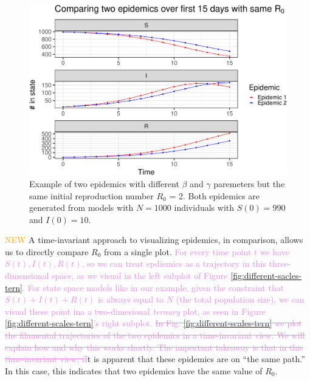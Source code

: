 \documentclass[
  shortnames]{jss}
\begin{document}
\begin{CodeChunk}
\begin{figure}[H]

{\centering \includegraphics{Figs/unnamed-chunk-2-1} 

}

\caption{\label{fig:different-scales-standard}Example of two epidemics with different $\beta$ and $\gamma$ paremeters but the same initial reproduction number $R_0$ = 2.  Both epidemics are generated from models with $N= 1000$ individuals with $S(0) = 990$ and $I(0) = 10$.}\label{fig:unnamed-chunk-2}
\end{figure}
\end{CodeChunk}

\textcolor{orange}{NEW} A time-invariant approach to visualizing
epidemics, in comparison, allows us to directly compare \(R_0\) from a
single plot.
\textcolor{violet}{For every time point $t$ we have $S(t),I(t), R(t)$, so we can treat epdiemics as a trajectory in this three-dimensional space, as we visual in the left subplot of Figure \ref{fig:different-sacles-tern}. For state space models like in our example, given the constraint that $S(t) + I(t)+R(t)$ is always equal to $N$ (the total population size), we can visual these point ina a two-dimesional \textit{ternary} plot, as seen in Figure \ref{fig:different-scales-tern}'s right subplot. \sout{In Fig. \ref{fig:different-scales-tern}
we plot the filamental trajectories of the two epidemics in a time-invariant view. We will explain how and why this works shortly. The important takeaway is that in this time-invariant view, i}I}t
is apparent that these epidemics are on ``the same path.'' In this case,
this indicates that two epidemics have the same value of \(R_0\).
\end{document}
